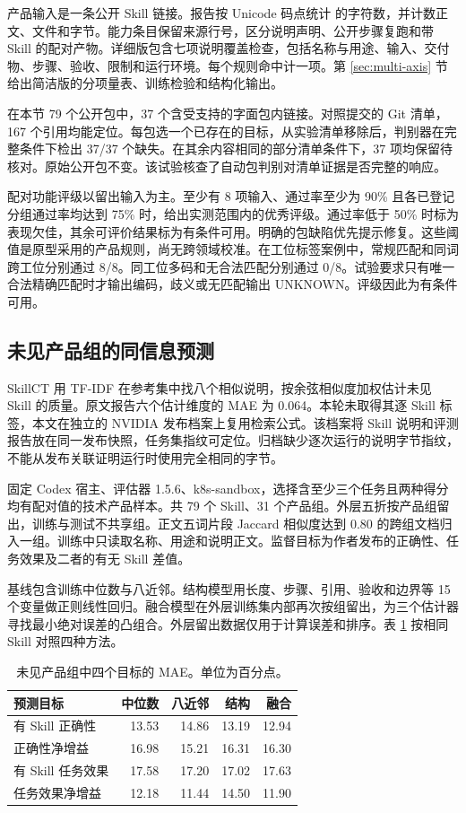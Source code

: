 \documentclass[final,5p,twocolumn,10pt]{elsarticle}
\begin{document}
产品输入是一条公开 Skill 链接。报告按 Unicode 码点统计  的字符数，并计数正文、文件和字节。能力条目保留来源行号，区分说明声明、公开步骤复跑和带 Skill 的配对产物。详细版包含七项说明覆盖检查，包括名称与用途、输入、交付物、步骤、验收、限制和运行环境。每个规则命中计一项。第 \ref{sec:multi-axis} 节给出简洁版的分项量表、训练检验和结构化输出。

在本节 79 个公开包中，37 个含受支持的字面包内链接。对照提交的 Git 清单，167 个引用均能定位。每包选一个已存在的目标，从实验清单移除后，判别器在完整条件下检出 37/37 个缺失。在其余内容相同的部分清单条件下，37 项均保留待核对。原始公开包不变。该试验核查了自动包判别对清单证据是否完整的响应。

配对功能评级以留出输入为主。至少有 8 项输入、通过率至少为 90\% 且各已登记分组通过率均达到 75\% 时，给出实测范围内的优秀评级。通过率低于 50\% 时标为表现欠佳，其余可评价结果标为有条件可用。明确的包缺陷优先提示修复。这些阈值是原型采用的产品规则，尚无跨领域校准。在工位标签案例中，常规匹配和同词跨工位分别通过 8/8。同工位多码和无合法匹配分别通过 0/8。试验要求只有唯一合法精确匹配时才输出编码，歧义或无匹配输出 UNKNOWN。评级因此为有条件可用。

\subsection{未见产品组的同信息预测}

SkillCT 用 TF-IDF 在参考集中找八个相似说明，按余弦相似度加权估计未见 Skill 的质量\cite{skillct}。原文报告六个估计维度的 MAE 为 0.064。本轮未取得其逐 Skill 标签，本文在独立的 NVIDIA 发布档案上复用检索公式\cite{nvidiacorpus}。该档案将 Skill 说明和评测报告放在同一发布快照，任务集指纹可定位。归档缺少逐次运行的说明字节指纹，不能从发布关联证明运行时使用完全相同的字节。

固定 Codex 宿主、评估器 1.5.6、k8s-sandbox，选择含至少三个任务且两种得分均有配对值的技术产品样本。共 79 个 Skill、31 个产品组。外层五折按产品组留出，训练与测试不共享组。正文五词片段 Jaccard 相似度达到 0.80 的跨组文档归入一组。训练中只读取名称、用途和说明正文。监督目标为作者发布的正确性、任务效果及二者的有无 Skill 差值。

基线包含训练中位数与八近邻。结构模型用长度、步骤、引用、验收和边界等 15 个变量做正则线性回归。融合模型在外层训练集内部再次按组留出，为三个估计器寻找最小绝对误差的凸组合。外层留出数据仅用于计算误差和排序。表 \ref{tab:unseen-estimate} 按相同 Skill 对照四种方法。

\begin{table}[!ht]
\centering\small
\caption{未见产品组中四个目标的 MAE。单位为百分点。}
\label{tab:unseen-estimate}
\begin{tabularx}{\columnwidth}{@{}Xrrrr@{}}
\toprule
预测目标 & 中位数 & 八近邻 & 结构 & 融合 \\
\midrule
有 Skill 正确性 & 13.53 & 14.86 & 13.19 & 12.94 \\
正确性净增益 & 16.98 & 15.21 & 16.31 & 16.30 \\
有 Skill 任务效果 & 17.58 & 17.20 & 17.02 & 17.63 \\
任务效果净增益 & 12.18 & 11.44 & 14.50 & 11.90 \\
\bottomrule
\end{tabularx}
\end{table}
\end{document}
